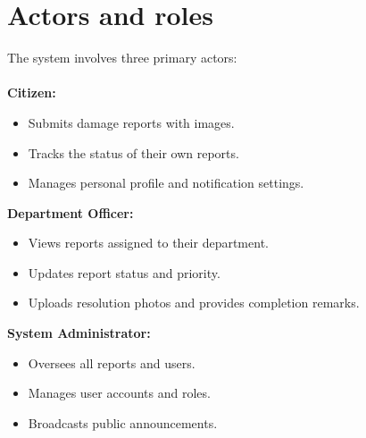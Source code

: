  \section{Actors and roles}
 The system involves three primary actors:
\\\\
 \textbf{Citizen:} 
 \begin{itemize}
    \item Submits damage reports with images.
    \item Tracks the status of their own reports.
    \item Manages personal profile and notification settings.
 \end{itemize}
 \textbf{Department Officer:} 
 \begin{itemize}
    \item Views reports assigned to their department.
    \item Updates report status and priority.
    \item Uploads resolution photos and provides completion remarks.
 \end{itemize}
 \textbf{System Administrator:} 
 \begin{itemize}
    \item Oversees all reports and users.
    \item Manages user accounts and roles.
    \item Broadcasts public announcements.
 \end{itemize}
